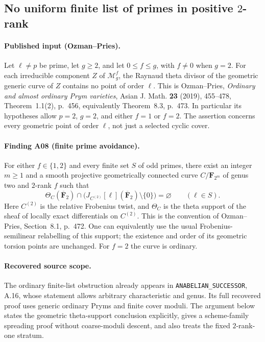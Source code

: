 \subsection{No uniform finite list of primes in positive $2$-rank}
\label{sec:finite-prime-avoidance}

\paragraph{Published input (Ozman--Pries).}
Let $\ell\ne p$ be prime, let $g\ge2$, and let $0\le f\le g$, with
$f\ne0$ when $g=2$.  For each irreducible component $Z$ of
$\mathcal M_g^f$, the Raynaud theta divisor of the geometric generic
curve of $Z$ contains no point of order $\ell$.  This is
Ozman--Pries, \emph{Ordinary and almost ordinary Prym varieties},
Asian J. Math. \textbf{23} (2019), 455--478,
Theorem~1.1(2), p.~456, equivalently Theorem~8.3, p.~473.
In particular its hypotheses allow $p=2$, $g=2$, and either $f=1$ or
$f=2$.  The assertion concerns every geometric point of order $\ell$,
not just a selected cyclic cover.

\paragraph{Finding A08 (finite prime avoidance).}
For either $f\in\{1,2\}$ and every finite set $S$ of odd primes, there
exist an integer $m\ge1$ and a smooth projective geometrically connected
curve $C/\mathbf F_{2^m}$ of genus two and $2$-rank $f$ such that
\[
 \Theta_C(\overline{\mathbf F}_2)\cap
 \bigl(J_{C^{(2)}}[\ell](\overline{\mathbf F}_2)\setminus\{0\}\bigr)
 =\varnothing\qquad(\ell\in S).
 \tag{FP.1}
\]
Here $C^{(2)}$ is the relative Frobenius twist, and $\Theta_C$ is the
theta support of the sheaf of locally exact differentials on $C^{(2)}$.
This is the convention of Ozman--Pries, Section~8.1, p.~472.
One can equivalently use the usual Frobenius-semilinear relabelling of
this support; the existence and order of its geometric torsion points
are unchanged.  For $f=2$ the curve is ordinary.

\paragraph{Recovered source scope.}
The ordinary finite-list obstruction already appears in
\texttt{ANABELIAN\_SUCCESSOR}, A.16, whose statement allows arbitrary
characteristic and genus.  Its full recovered proof uses generic
ordinary Pryms and finite cover moduli.  The argument below states the
geometric theta-support conclusion explicitly, gives a scheme-family
spreading proof without coarse-moduli descent, and also treats the
fixed $2$-rank-one stratum.

